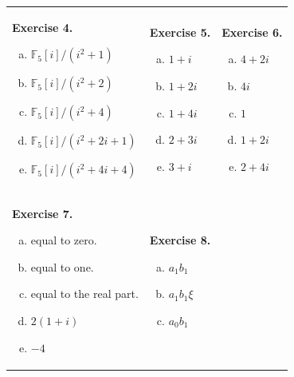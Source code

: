 \documentclass[../lecture-notes.tex]{subfiles}
\begin{document}
\begin{center}
    \begin{tabular}{p{2.9cm}p{1.6cm}p{3cm}}
        \textbf{Exercise 4.}
        \begin{enumerate}[a)]
            \item $\mathbb{F}_5[i]/(i^2+1)$
            \item $\mathbb{F}_5[i]/(i^2+2)$
            \item $\mathbb{F}_5[i]/(i^2+4)$
            \item $\mathbb{F}_5[i]/(i^2+2i+1)$
            \item $\mathbb{F}_5[i]/(i^2+4i+4)$
        \end{enumerate} &   
        \textbf{Exercise 5.}
        \begin{enumerate}[a)]
            \item $1+i$
            \item $1+2i$
            \item $1+4i$
            \item $2+3i$
            \item $3+i$
        \end{enumerate} &
        \textbf{Exercise 6.}
        \begin{enumerate}[a)]
            \item $4+2i$
            \item $4i$
            \item $1$
            \item $1+2i$
            \item $2+4i$
        \end{enumerate}
        \\
        \textbf{Exercise 7.}
        \begin{enumerate}[a)]
            \item equal to zero.
            \item equal to one.
            \item equal to the real part.
            \item $2(1+i)$
            \item $-4$
        \end{enumerate} & 
        \textbf{Exercise 8.}
        \begin{enumerate}[a)]
            \item $a_1b_1$
            \item $a_1b_1\xi$
            \item $a_0b_1$

\end{enumerate}
\end{tabular}
\end{center}
\end{document}
